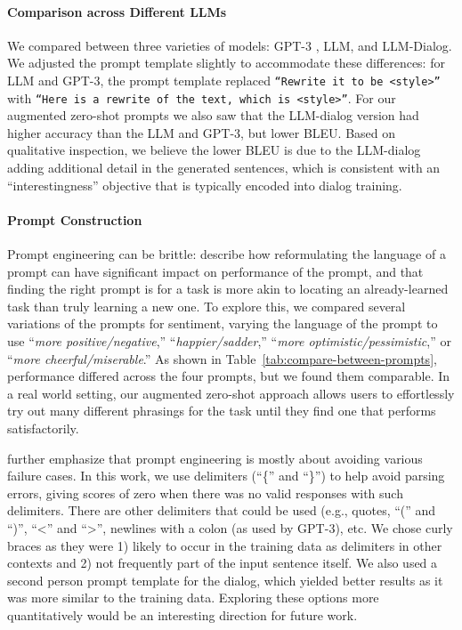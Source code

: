 

\paragraph{Comparison across Different LLMs}
We compared between three varieties of models: GPT-3 \citep{DBLP:journals/corr/abs-2005-14165}, LLM, and  LLM-Dialog. We adjusted the prompt template slightly to accommodate these differences: for  LLM and GPT-3, the prompt template replaced {\small
\texttt{``Rewrite it to be \textbf{<style>}''}
with \small \texttt{``Here is a rewrite of the text, which is \textbf{<style>}''}.}
For our augmented zero-shot prompts we also saw that the LLM-dialog version had higher accuracy than the LLM and GPT-3, but lower BLEU.
Based on qualitative inspection, we believe the lower BLEU is due to the LLM-dialog adding additional detail in the generated sentences, which is consistent with an ``interestingness'' objective that is typically encoded into dialog training. 


\paragraph{Prompt Construction}
\label{sec:prompt-selection}
Prompt engineering can be brittle: \citet{reynolds2021prompt} describe how reformulating the language of a prompt can have significant impact on performance of the prompt, and that finding the right prompt is for a task is more akin to locating an already-learned task than truly learning a new one.
To explore this, we compared several variations of the prompts for sentiment, varying the language of the prompt to use ``\textit{more {positive/negative}},'' ``\textit{{happier/sadder}},''
``\textit{more {optimistic/pessimistic}},'' or
``\textit{more {cheerful/miserable}}.''
As shown in Table~\ref{tab:compare-between-prompts}, performance differed across the four prompts, but we found them comparable.
In a real world setting, our augmented zero-shot approach allows users to effortlessly try out many different phrasings for the task until they find one that performs satisfactorily.



\citet{reynolds2021prompt} further emphasize that prompt engineering is mostly about avoiding various failure cases.
 In this work, we use delimiters (``\{'' and ``\}'') to help avoid parsing errors, giving scores of zero when there was no valid responses with such delimiters. There are other delimiters that could be used (e.g., quotes, ``('' and ``)'', ``<'' and ``>'', newlines with a colon (as used by GPT-3), etc. We chose curly braces as they were 1) likely to occur in the training data as delimiters in other contexts and 2) not frequently part of the input sentence itself. We also used a second person prompt template for the dialog, which yielded better results as it was more similar to the training data.
 Exploring these options more quantitatively would be an interesting direction for future work.

